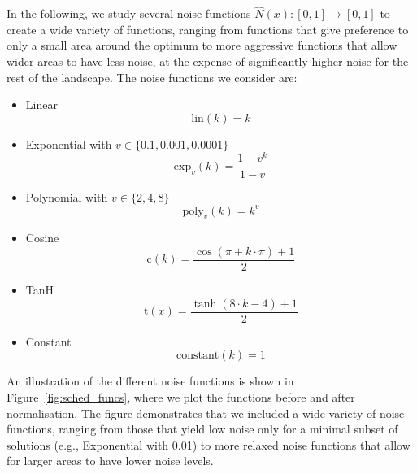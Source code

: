 
In the following, we study several noise functions $\hat{N}(x):[0,1]\rightarrow[0,1]$ to create a wide variety of functions, ranging from functions that give preference to only a small area around the optimum to more aggressive functions that allow wider areas to have less noise, at the expense of significantly higher noise for the rest of the landscape. The noise functions we consider are:
\begin{itemize}
    \item Linear
    \begin{equation*}
        \text{lin}(k)=k
    \end{equation*}
    \item Exponential with $v\in\{0.1, 0.001, 0.0001\}$
    \begin{equation*}
        \text{exp}_v(k)=\frac{1-v^k}{1-v}
    \end{equation*}
    \item Polynomial with $v\in\{2,4,8\}$
    \begin{equation*}
        \text{poly}_v(k)=k^v
    \end{equation*}
    \item Cosine
    \begin{equation*}
        \text{c}(k)=\frac{\cos{(\pi + k \cdot \pi)} +1}{2}
    \end{equation*}
    \item TanH
    \begin{equation*}
        \text{t}(x)=\frac{\tanh{(8 \cdot k - 4)} + 1}{2}
    \end{equation*}
    \item Constant
    \begin{equation*}
        \text{constant}(k)=1
    \end{equation*}
\end{itemize}

An illustration of the different noise functions is shown in Figure~\ref{fig:sched_funcs}, where we plot the functions before and after normalisation. The figure demonstrates that we included a wide variety of noise functions, ranging from those that yield low noise only for a minimal subset of solutions (e.g., Exponential with 0.01) to more relaxed noise functions that allow for larger areas to have lower noise levels. 

